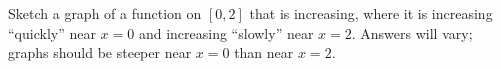 {Sketch a graph of a function on $[0,2]$ that is increasing, where it is increasing ``quickly'' near $x=0$ and increasing ``slowly'' near $x=2$.
}
{Answers will vary; graphs should be steeper near $x=0$ than near $x=2$.
}
